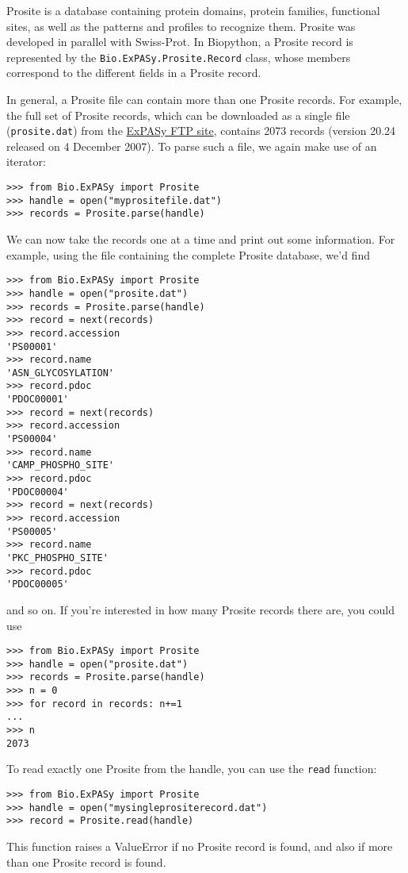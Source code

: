 Prosite is a database containing protein domains, protein families, functional sites, as well as the patterns and profiles to recognize them. Prosite was developed in parallel with Swiss-Prot. In Biopython, a Prosite record is represented by the \verb|Bio.ExPASy.Prosite.Record| class, whose members correspond to the different fields in a Prosite record.

In general, a Prosite file can contain more than one Prosite records. For example, the full set of Prosite records, which can be downloaded as a single file (\verb|prosite.dat|) from the \href{ftp://ftp.expasy.org/databases/prosite/prosite.dat}{ExPASy FTP site}, contains 2073 records (version 20.24 released on 4 December 2007). To parse such a file, we again make use of an iterator:

\begin{verbatim}
>>> from Bio.ExPASy import Prosite
>>> handle = open("myprositefile.dat")
>>> records = Prosite.parse(handle)
\end{verbatim}

We can now take the records one at a time and print out some information. For example, using the file containing the complete Prosite database, we'd find
\begin{verbatim}
>>> from Bio.ExPASy import Prosite
>>> handle = open("prosite.dat")
>>> records = Prosite.parse(handle)
>>> record = next(records)
>>> record.accession
'PS00001'
>>> record.name
'ASN_GLYCOSYLATION'
>>> record.pdoc
'PDOC00001'
>>> record = next(records)
>>> record.accession
'PS00004'
>>> record.name
'CAMP_PHOSPHO_SITE'
>>> record.pdoc
'PDOC00004'
>>> record = next(records)
>>> record.accession
'PS00005'
>>> record.name
'PKC_PHOSPHO_SITE'
>>> record.pdoc
'PDOC00005'
\end{verbatim}
and so on. If you're interested in how many Prosite records there are, you could use
\begin{verbatim}
>>> from Bio.ExPASy import Prosite
>>> handle = open("prosite.dat")
>>> records = Prosite.parse(handle)
>>> n = 0
>>> for record in records: n+=1
...
>>> n
2073
\end{verbatim}

To read exactly one Prosite from the handle, you can use the \verb|read| function:
\begin{verbatim}
>>> from Bio.ExPASy import Prosite
>>> handle = open("mysingleprositerecord.dat")
>>> record = Prosite.read(handle)
\end{verbatim}
This function raises a ValueError if no Prosite record is found, and also if more than one Prosite record is found.

